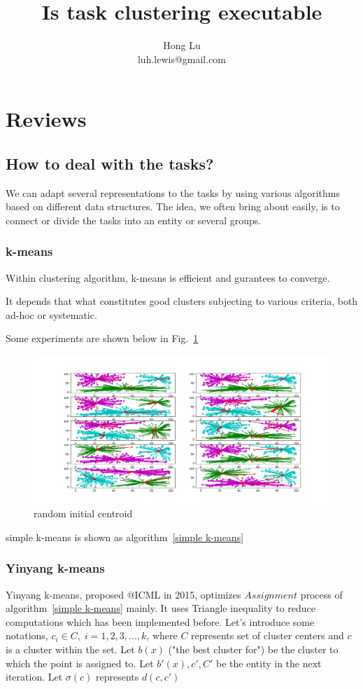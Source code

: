 \documentclass[12pt, a4paper]{article}
\author{Hong Lu \\ luh.lewis@gmail.com}
\date{}
\begin{document}
    \title{Is task clustering executable}
    \maketitle

    \section{Reviews}
    \subsection*{How to deal with the tasks?}
    We can adapt several representations to the tasks by using various algorithms based on different data structures.
    The idea, we often bring about easily, is to connect or divide the tasks into an entity or several groups.
    \subsubsection*{k-means}
    Within clustering algorithm, k-means is efficient and gurantees to converge. 
    
    It depends that what constitutes good clusters subjecting to various criteria, both ad-hoc or systematic.  
    
    Some experiments are shown below in Fig.~\ref{fig:random k-means}

    \begin{figure}
        \centering
        \includegraphics[width = 1.3\textwidth]{../img/randomcentroid.png}
        \caption{random initial centroid}
        \label{fig:random k-means}
    \end{figure}

    simple k-means is shown as algorithm~\ref{simple k-means}
    
    \subsubsection*{Yinyang k-means}
    Yinyang k-means, proposed @ICML in 2015, optimizes $Assignment$ process of algorithm~\ref{simple k-means} mainly.
    It uses Triangle inequality to reduce computations which has been implemented before.
    Let's introduce some notations, $c_{i} \in C,\; i = 1,2,3,...,k$, where $C$ represents set of cluster centers and $c$ is a cluster within the set.
    Let $b(x)$ ("the best cluster for") be the cluster to which the point is assigned to. Let $b'(x), c',C'$ be the entity in the next iteration.
    Let $\sigma(c)$ represents $d(c, c')$
\end{document}
